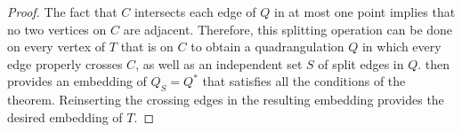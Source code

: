\documentclass{patmorin}
\begin{document}
\begin{proof}
   The fact that $C$ intersects each edge of $Q$ in at most one point
   implies that no two vertices on $C$ are adjacent.
   Therefore, this splitting
   operation can be done on every vertex of $T$ that is on $C$ to obtain
   a quadrangulation $Q$ in which every edge properly crosses $C$,
   as well as an independent set $S$ of split edges in $Q$.  
   then provides an embedding of $Q_S=Q^*$ that satisfies all the conditions of
   the theorem.  Reinserting the crossing edges in the resulting
   embedding provides the desired embedding of $T$.
%
%
%
%
%
%
%

\end{proof}
\end{document}
